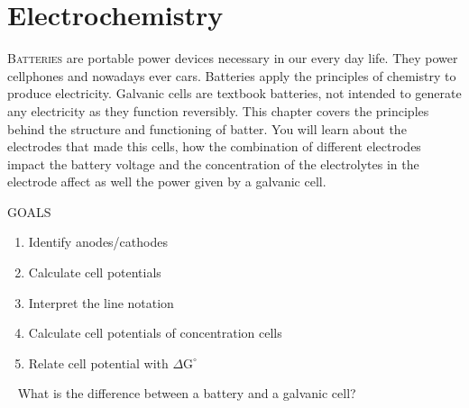 \documentclass[main.tex]{subfiles}
\begin{document}
\linenumbers
  
\chapter[Electrochemistry]{Electrochemistry}


      \begin{marginfigure}
\end{marginfigure}


\lettrine[lines=4]{\color{black!45}B}{atteries} are portable power devices necessary in our every day life. They power cellphones and nowadays ever cars. Batteries apply the principles of chemistry to produce electricity. Galvanic cells are textbook batteries, not intended to generate any electricity as they function reversibly. This chapter covers the principles behind the structure and functioning of batter. You will learn about the electrodes that made this cells, how the combination of different electrodes impact the battery voltage and the concentration of the electrolytes in the electrode affect as well the power given by a galvanic cell.  
\begin{marginfigure}%
\begin{mytcbox}{GOALS}
\begin{enumerate}[label=\protect\circled{\color{white}\arabic*}]
\item Identify anodes/cathodes
\item Calculate cell potentials
\item Interpret the line notation
\item Calculate cell potentials of concentration cells
\item Relate cell potential with $\Delta \text{G}^{\circ}$
\end{enumerate}
\end{mytcbox}
\vspace{1cm}
\begin{tcolorbox}[enhanced,colback=red!5!white,colframe=black!50!red,boxrule=1pt,
  arc=0pt,outer arc=0pt,drop heavy lifted shadow]
\faGears\ 
 What is the difference between a battery and a galvanic cell? \end{tcolorbox}
\end{marginfigure}%
\end{document}
